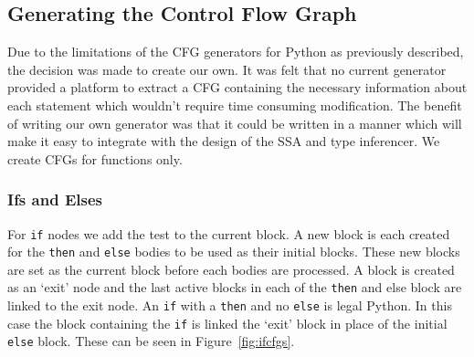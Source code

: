 \documentclass[12pt, titlepage]{article}
\begin{document}
\subsection{Generating the Control Flow Graph}
Due to the limitations of the CFG generators for Python as previously described, the decision was made to create our own. It was felt that no current generator provided a platform to extract a CFG containing the necessary information about each statement which wouldn't require time consuming modification. The benefit of writing our own generator was that it could be written in a manner which will make it easy to integrate with the design of the SSA and type inferencer. We create CFGs for functions only.

\subsubsection{Ifs and Elses}
For \texttt{if} nodes we add the test to the current block. A new block is each created for the \texttt{then} and \texttt{else} bodies to be used as their initial blocks. These new blocks are set as the current block before each bodies are processed. A block is created as an `exit' node and the last active blocks in each of the \texttt{then} and {else} block are linked to the exit node. An \texttt{if} with a \texttt{then} and no \texttt{else} is legal Python. In this case the block containing the \texttt{if} is linked the `exit' block in place of the initial \texttt{else} block. These can be seen in Figure~\ref{fig:ifcfgs}.
\end{document}
